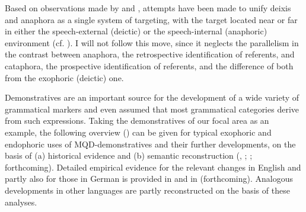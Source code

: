 \documentclass[output=paper,colorlinks,citecolor=brown]{langscibook}
\begin{document}
Based on observations made by \citet{Tomasello1995} and \citet{Diessel2006}, attempts have been made to unify deixis and anaphora as a single system of targeting, with the target located near or far in either the speech-external (deictic) or the speech-internal (anaphoric) environment (cf. \citealt{Talmy2017}). I will not follow this move, since it neglects the parallelism in the contrast between anaphora, the retrospective identification of referents, and cataphora, the prospective identification of referents, and the difference of both from the exophoric (deictic) one.

Demonstratives are an important source for the development of a wide variety of grammatical markers and \citet{Brugmann1904} even assumed that most grammatical categories derive from such expressions. Taking the demonstratives of our focal area as an example, the following overview () can be given for typical exophoric and endophoric uses of MQD-demonstratives and their further developments, on the basis of (a) historical evidence and (b) semantic reconstruction (\citealt{König2015}, \citeyear{König2017}; \citealt{KönigNishina2015}; \citeauthor{KönigVezzosi} forthcoming). Detailed empirical evidence for the relevant changes in English and partly also for those in German is provided in \citet{König2017} and in \citeauthor{KönigVezzosi} (forthcoming). Analogous developments in other languages are partly reconstructed on the basis of these analyses.

\end{document}
